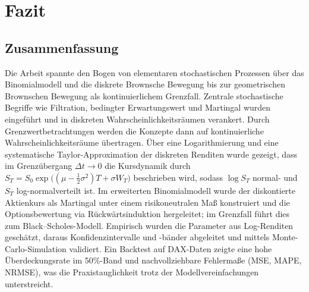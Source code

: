 \section{Fazit}

\subsection{Zusammenfassung}

Die Arbeit spannte den Bogen von elementaren stochastischen Prozessen über das Binomialmodell und die diskrete Brownsche 
Bewegung bis zur geometrischen Brownschen Bewegung als kontinuierlichem Grenzfall. Zentrale stochastische Begriffe wie 
Filtration, bedingter Erwartungswert und Martingal wurden eingeführt und in diskreten Wahrscheinlichkeitsräumen verankert. 
Durch Grenzwertbetrachtungen werden die Konzepte dann auf kontinuierliche Wahrscheinlichkeitsräume übertragen. Über eine 
Logarithmierung und eine systematische Taylor-Approximation der diskreten Renditen wurde gezeigt, dass im Grenzübergang 
$\Delta t \to 0$ die Kursdynamik durch
$S_T = S_0 \exp\!\big((\mu - \tfrac12\sigma^2)T + \sigma W_T\big)$
beschrieben wird, sodass $\log S_T$ normal- und $S_T$ log-normalverteilt ist. Im erweiterten Binomialmodell 
wurde der diskontierte Aktienkurs als Martingal unter einem risikoneutralen Maß konstruiert und die Optionsbewertung 
via Rückwärtsinduktion hergeleitet; im Grenzfall führt dies zum Black–Scholes-Modell. Empirisch wurden die Parameter aus 
Log-Renditen geschätzt, daraus Konfidenzintervalle und -bänder abgeleitet und mittels Monte-Carlo-Simulation validiert. 
Ein Backtest auf DAX-Daten zeigte eine hohe Überdeckungsrate im 50\%-Band und nachvollziehbare Fehlermaße (MSE, MAPE, NRMSE), 
was die Praxistauglichkeit trotz der Modellvereinfachungen unterstreicht.


